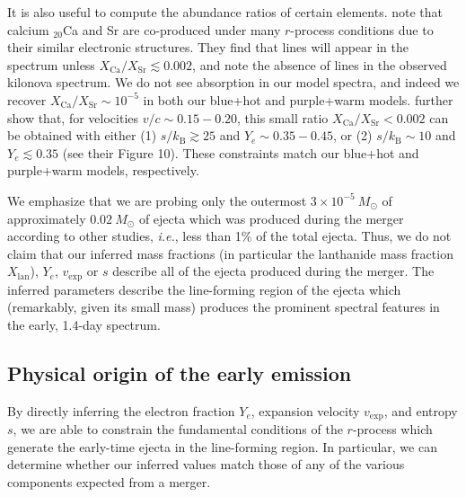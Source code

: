 \documentclass[twocolumn, twocolappendix]{aastex63}
\def\ie{{\it i.e.}}
\begin{document}
It is also useful to compute the abundance ratios of certain elements. \cite{domoto21} note that calcium ${}_{20}$Ca and Sr are co-produced under many $r$-process conditions due to their similar electronic structures. They find that  lines will appear in the spectrum unless $X_{\mathrm{Ca}} / X_{\mathrm{Sr}} \lesssim 0.002$, and note the absence of  lines in the observed kilonova spectrum. We do not see  absorption in our model spectra, and indeed we recover $X_{\mathrm{Ca}} / X_{\mathrm{Sr}} \sim 10^{-5}$ in both our blue+hot and purple+warm models. \cite{domoto21} further show that, for velocities $v/c \sim 0.15 - 0.20$, this small ratio $X_{\mathrm{Ca}} / X_{\mathrm{Sr}} < 0.002$ can be obtained with either (1) $s/k_{\mathrm{B}} \gtrsim 25$ and $Y_e \sim 0.35-0.45$, or (2) $s/k_{\mathrm{B}} \sim 10$ and $Y_e \lesssim 0.35$ (see their Figure 10). These constraints match our blue+hot and purple+warm models, respectively.

We emphasize that we are probing only the outermost $3 \times 10^{-5}~M_{\odot}$ of approximately $0.02~M_{\odot}$ of ejecta which was produced during the merger according to other studies, \ie, less than 1\% of the total ejecta. Thus, we do not claim that our inferred mass fractions (in particular the lanthanide mass fraction $X_{\mathrm{lan}}$), $Y_e$, $v_{\mathrm{exp}}$ or $s$ describe all of the ejecta produced during the merger. The inferred parameters describe the line-forming region of the ejecta which (remarkably, given its small mass) produces the prominent spectral features in the early, 1.4-day spectrum.



\subsection{Physical origin of the early emission}\label{ssc:physical_origin}

By directly inferring the electron fraction $Y_e$, expansion velocity $v_{\mathrm{exp}}$, and entropy $s$, we are able to constrain the fundamental conditions of the $r$-process which generate the early-time ejecta in the line-forming region. In particular, we can determine whether our inferred values match those of any of the various components expected from a merger. 
\end{document}
